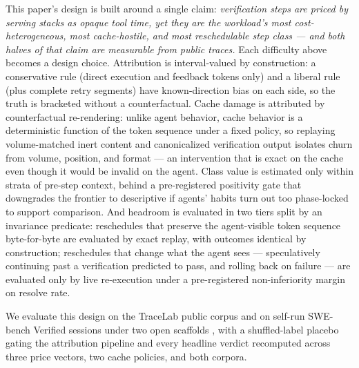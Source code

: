 \documentclass[11pt]{article}
\begin{document}
This paper's design is built around a single claim: \emph{verification steps are priced by serving stacks as opaque tool time, yet they are the workload's most cost-heterogeneous, most cache-hostile, and most reschedulable step class --- and both halves of that claim are measurable from public traces.} Each difficulty above becomes a design choice. Attribution is interval-valued by construction: a conservative rule (direct execution and feedback tokens only) and a liberal rule (plus complete retry segments) have known-direction bias on each side, so the truth is bracketed without a counterfactual. Cache damage is attributed by counterfactual re-rendering: unlike agent behavior, cache behavior is a deterministic function of the token sequence under a fixed policy, so replaying volume-matched inert content and canonicalized verification output isolates churn from volume, position, and format --- an intervention that is exact on the cache even though it would be invalid on the agent. Class value is estimated only within strata of pre-step context, behind a pre-registered positivity gate that downgrades the frontier to descriptive if agents' habits turn out too phase-locked to support comparison. And headroom is evaluated in two tiers split by an invariance predicate: reschedules that preserve the agent-visible token sequence byte-for-byte are evaluated by exact replay, with outcomes identical by construction; reschedules that change what the agent sees --- speculatively continuing past a verification predicted to pass, and rolling back on failure --- are evaluated only by live re-execution under a pre-registered non-inferiority margin on resolve rate.

We evaluate this design on the TraceLab public corpus and on self-run SWE-bench Verified sessions \citep{Jimenez2024SWEbench} under two open scaffolds \citep{Yang2024SWEagent,Wang2024OpenHands}, with a shuffled-label placebo gating the attribution pipeline and every headline verdict recomputed across three price vectors, two cache policies, and both corpora.
\end{document}
